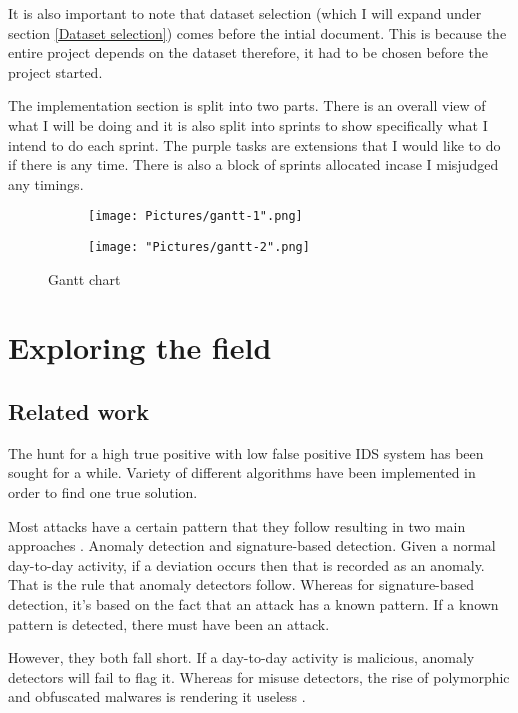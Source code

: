\documentclass[11pt]{article}
\begin{document}
It is also important to note that dataset selection (which I will expand under section \ref{Dataset selection}) comes before the intial document. This is because the entire project depends on the dataset therefore, it had to be chosen before the project started.

The implementation section is split into two parts. There is an overall view of what I will be doing and it is also split into sprints to show specifically what I intend to do each sprint. The purple tasks are extensions that I would like to do if there is any time. There is also a block of sprints allocated incase I misjudged any timings.

\begin{figure}[!p]
    \centering
    \begin{subfigure}{\linewidth}
      \texttt{[image: Pictures/gantt-1".png]}
    \end{subfigure}
    \begin{subfigure}{\linewidth}
      \texttt{[image: "Pictures/gantt-2".png]}
    \end{subfigure}
    \caption{Gantt chart}
    \label{fig:image10}
\end{figure}

\newpage
\section{Exploring the field}
\subsection{Related work}
The hunt for a high true positive with low false positive IDS system has been sought for a while. Variety of different algorithms have been implemented in order to find one true solution. 

Most attacks have a certain pattern that they follow resulting in two main approaches \cite{related-work-main-approaches}. Anomaly detection and signature-based detection. Given a normal day-to-day activity, if a deviation occurs then that is recorded as an anomaly. That is the rule that anomaly detectors follow. Whereas for signature-based detection, it’s based on the fact that an attack has a known pattern. If a known pattern is detected, there must have been an attack.

However, they both fall short. If a day-to-day activity is malicious, anomaly detectors will fail to flag it. Whereas for misuse detectors, the rise of polymorphic and obfuscated malwares is rendering it useless \cite{related-work-main-approaches}.
\end{document}
